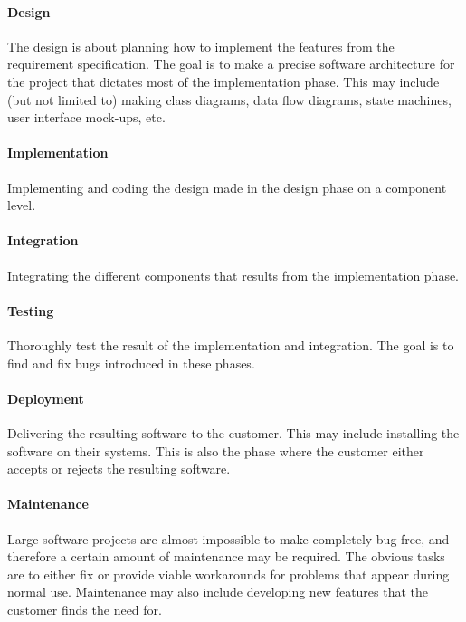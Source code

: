 \paragraph{Design}
The design is about planning how to implement the features from the
requirement specification. The goal is to make a precise software architecture for the
project that dictates most of the implementation phase. This may include (but
not limited to) making class diagrams, data flow diagrams, state machines, user
interface mock-ups, etc.

\paragraph{Implementation}
Implementing and coding the design made in the design phase on
a component level.

\paragraph{Integration}
Integrating the different components that results from the
implementation phase.

\paragraph{Testing}
Thoroughly test the result of the implementation and
integration. The goal is to find and fix bugs introduced in these
phases.

\paragraph{Deployment}
Delivering the resulting software to the customer. This may include installing the software on their systems. This is also the phase where the customer either accepts or rejects the resulting software.

\paragraph{Maintenance}
Large software projects are almost impossible to make completely bug free, and
therefore a certain amount of maintenance may be required. The obvious tasks
are to either fix or provide viable workarounds for problems that appear during
normal use. Maintenance may also include developing new features that the
customer finds the need for.

